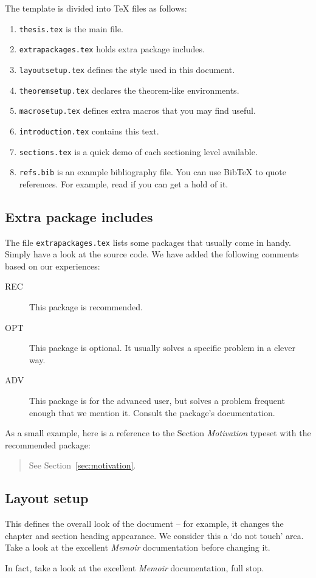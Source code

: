 The template is divided into \TeX{} files as follows:
\begin{enumerate}
\item \texttt{thesis.tex} is the main file.
\item \texttt{extrapackages.tex} holds extra package includes.
\item \texttt{layoutsetup.tex} defines the style used in this document.
\item \texttt{theoremsetup.tex} declares the theorem-like environments.
\item \texttt{macrosetup.tex} defines extra macros that you may find
  useful.
\item \texttt{introduction.tex} contains this text.
\item \texttt{sections.tex} is a quick demo of each sectioning level
  available.
\item \texttt{refs.bib} is an example bibliography file.  You can use
  Bib\TeX{} to quote references.  For example, read
  \cite{bringhurst1996ets} if you can get a hold of it.
\end{enumerate}


\subsection{Extra package includes}

The file \texttt{extrapackages.tex} lists some packages that usually
come in handy.  Simply have a look at the source code.  We have
added the following comments based on our experiences:
\begin{description}
\item[REC] This package is recommended.
\item[OPT] This package is optional.  It usually solves a specific
  problem in a clever way.
\item[ADV] This package is for the advanced user, but solves a problem
  frequent enough that we mention it. Consult the package's
  documentation.
\end{description}

As a small example, here is a reference to the Section \emph{Motivation}
typeset with the recommended  package:
\begin{quote}
  See Section~\vref{sec:motivation}.
\end{quote}


\subsection{Layout setup}

This defines the overall look of the document -- for example, it changes the chapter and section heading appearance.  We consider this a `do not touch' area.  Take a look at the excellent \emph{Memoir} documentation before changing it.

In fact, take a look at the excellent \emph{Memoir} documentation, full stop.